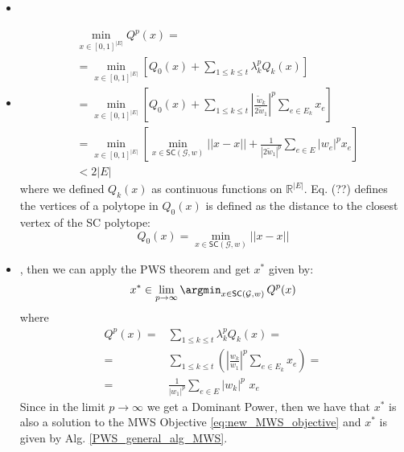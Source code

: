 
\begin{itemize}
\item  
\item 
\begin{align}
&\min_{x  \in [0,1]^{|E|}} Q^p(x) = \\ 
&= \min_{x \in [0,1]^{|E|}} \left[ Q_0(x) + \sum_{1 \leq k\leq t} \lambda_k^p Q_k(x) \right ] \\ 
&= \min_{x \in [0,1]^{|E|}} \left[ Q_0(x) + \sum_{1 \leq k\leq t} \left|  \frac{\tilde{w}_k}{2 \tilde{w}_1} \right|^p  \sum_{e\in E_{k}} x_e \right ] \\ 
&= \min_{x \in [0,1]^{|E|}} \left[ \min_{x \in \mathsf{SC}(\mathcal{G},w)} ||x-x|| + \frac{1}{|2 \tilde{w}_1|^p} \sum_{e\in E} |w_e|^p x_e \right ] \\ 
& < 2 |E|
\end{align}
where we defined $Q_k(x)$ as continuous functions on $\mathbb{R}^{|E|}$. Eq. (??) defines the vertices of a polytope in  $Q_0(x)$ is defined as the distance to the closest vertex of the SC polytope:
\begin{equation}
Q_0(x) = \min_{x \in \mathsf{SC}(\mathcal{G},w)} ||x-x||
\end{equation}

\item {}, then we can apply the PWS theorem and get $x^*$ given by:
\begin{align}
x^* \in \lim_{p\rightarrow \infty} \argmin_{x\in \mathsf{SC}(\mathcal{G},w)} \, Q^p(x)
\end{align}
where 
\begin{align}
Q^p(x) =& \sum_{1 \leq k\leq t} \lambda^p_k Q_k (x) = \\
 =& \sum_{1 \leq k\leq t} \left ( \left | \frac{w_k}{w_1} \right |^p \sum_{e\in E_{k}} x_e \right ) = \\
 =& \frac{1}{|w_1|^p} \sum_{e \in E} |w_k|^p \,\,x_e 
\end{align}
Since in the limit $p \rightarrow \infty$ we get a Dominant Power, then we have that $x^*$ is also a solution to the MWS Objective \ref{eq:new_MWS_objective} and $x^*$ is given by Alg. \ref{PWS_general_alg_MWS}.
\end{itemize}

